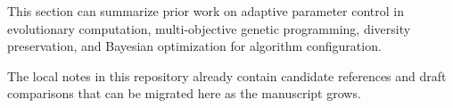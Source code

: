 This section can summarize prior work on adaptive parameter control in
evolutionary computation, multi-objective genetic programming, diversity
preservation, and Bayesian optimization for algorithm configuration.

The local notes in this repository already contain candidate references
and draft comparisons that can be migrated here as the manuscript grows.
